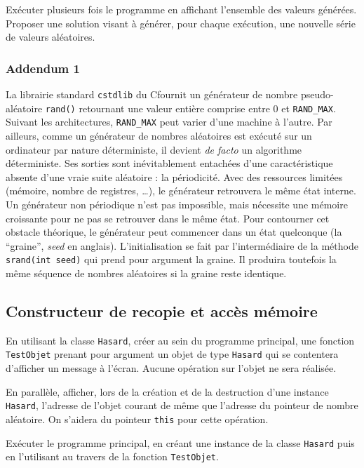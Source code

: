 \documentclass{book}
\newcommand{\cpp}{\mbox{C\vspace{.5em}\protect\raisebox{.2ex}{\footnotesize++~}}}
\begin{document}
Exécuter plusieurs fois le programme en affichant l'ensemble des valeurs générées. Proposer
une solution visant à générer, pour chaque exécution, une nouvelle série de valeurs aléatoires.

\subsubsection{Addendum 1}
\label{sec:orgheadline1}

La librairie standard \texttt{cstdlib} du \cpp fournit un générateur de nombre
pseudo-aléatoire \texttt{rand()} retournant une valeur entière comprise entre 0 et
\texttt{RAND\_MAX}. Suivant les architectures, \texttt{RAND\_MAX} peut varier d'une machine à
l'autre. Par ailleurs, comme un générateur de nombres aléatoires est exécuté sur
un ordinateur par nature déterministe, il devient \emph{de facto} un algorithme
déterministe. Ses sorties sont inévitablement entachées d'une caractéristique
absente d'une vraie suite aléatoire : la périodicité. Avec des ressources
limitées (mémoire, nombre de registres, \ldots{}), le générateur retrouvera le même
état interne. Un générateur non périodique n'est pas impossible, mais nécessite
une mémoire croissante pour ne pas se retrouver dans le même état. Pour
contourner cet obstacle théorique, le générateur peut commencer dans un état
quelconque (la ``graine'', \emph{seed} en anglais). L'initialisation se fait par
l'intermédiaire de la méthode \texttt{srand(int seed)} qui prend pour argument la
graine. Il produira toutefois la même séquence de nombres aléatoires si la graine
reste identique.


\subsection{Constructeur de recopie et accès mémoire}
\label{sec:orgheadline2}

En utilisant la classe \texttt{Hasard}, créer au sein du programme principal, une
fonction \texttt{TestObjet} prenant pour argument un objet de type \texttt{Hasard} qui se
contentera d'afficher un message à l'écran. Aucune opération sur l'objet ne sera
réalisée.

En parallèle, afficher, lors de la création et de la destruction d'une instance
\texttt{Hasard}, l'adresse de l'objet courant de même que l'adresse du pointeur de
nombre aléatoire. On s'aidera du pointeur \texttt{this} pour cette opération.

Exécuter le programme principal, en créant une instance de la classe \texttt{Hasard}
puis en l'utilisant au travers de la fonction \texttt{TestObjet}.
\end{document}
